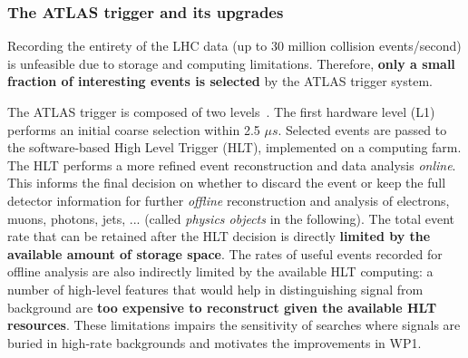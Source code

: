 \subsubsection{The ATLAS trigger and its upgrades}
\smallskip

Recording the entirety of the LHC data (up to 30 million collision events/second) is unfeasible due to storage and computing limitations. 
Therefore, \textbf{only a small fraction of interesting events is selected} by the ATLAS trigger system. 

The ATLAS trigger is composed of two levels~\cite{ToBeCited}. %
The first hardware level (L1) performs an initial coarse selection within 2.5 $\mu s$. 
Selected events are passed to the software-based High Level Trigger (HLT), implemented on a computing farm. 
The HLT performs a more refined event reconstruction and data analysis \textit{online}. 
This informs the final decision on whether to discard the event or keep the full detector information for further \textit{offline} reconstruction and analysis of electrons, muons, photons, jets, ... (called \textit{physics objects} in the following). 
The total event rate that can be retained after the HLT decision is directly \textbf{limited by the available amount of storage space}. 
The rates of useful events recorded for offline analysis are also indirectly limited by the available HLT computing: 
a number of high-level features that would help in distinguishing signal from background are \textbf{too expensive to reconstruct given the available HLT resources}. 
These limitations impairs the sensitivity of searches where signals are buried in high-rate backgrounds and motivates the improvements in WP1. 

